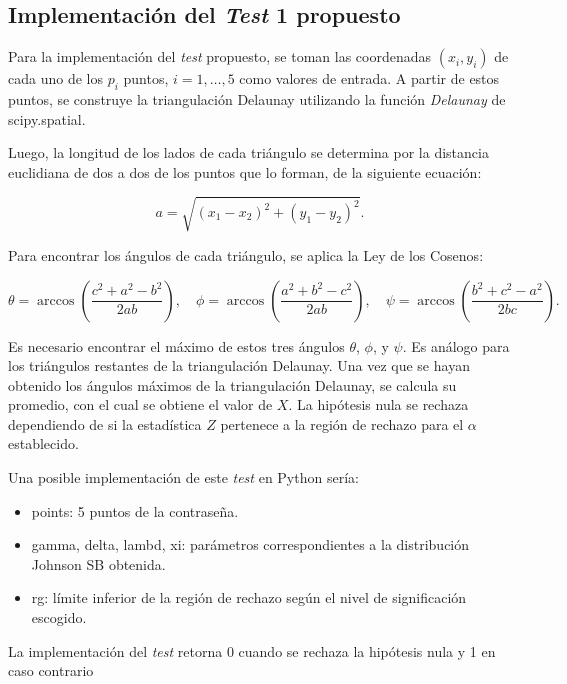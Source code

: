 \documentclass[12pt]{report}
\begin{document}
\subsection{Implementación del \textit{Test} 1 propuesto}
\label{sec:1.3}

Para la implementación del \textit{test} propuesto, se toman las coordenadas \((x_i, y_i)\) de cada uno de los \(p_i\) puntos, \(i = 1, \ldots, 5\) como valores de entrada. A partir de estos puntos, se construye la triangulación Delaunay utilizando la función \textit{Delaunay} de scipy.spatial.

Luego, la longitud de los lados de cada triángulo se determina por la distancia euclidiana de dos a dos de los puntos que lo forman, de la siguiente ecuación:

\[
a = \sqrt{(x_{1} - x_{2})^2 + (y_{1} - y_{2})^2} .
\]

Para encontrar los ángulos de cada triángulo, se aplica la Ley de los Cosenos:

\[
\theta = \arccos\left(\frac{c^2 + a^2 - b^2}{2ab}\right), \quad \phi = \arccos\left(\frac{a^2 + b^2 - c^2}{2ab}\right), \quad \psi = \arccos\left(\frac{b^2 + c^2 - a^2}{2bc}\right).
\]

Es necesario encontrar el máximo de estos tres ángulos \(\theta\), \(\phi\), y \(\psi\). Es análogo para los triángulos restantes de la triangulación Delaunay. Una vez que se hayan obtenido los ángulos máximos de la triangulación Delaunay, se calcula su promedio, con el cual se obtiene el valor de  \(X\). La hipótesis nula se rechaza dependiendo de si la estadística \(Z\) pertenece a la región de rechazo para el \(\alpha\) establecido.

Una posible implementación de este \textit{test} en Python sería:
\begin{itemize}
	\item points: 5 puntos de la contraseña. 
	\item gamma, delta, lambd, xi: parámetros correspondientes a la distribución Johnson SB obtenida.
	\item rg: límite inferior de la región de rechazo según el nivel de significación escogido.
	
\end{itemize}
La implementación del \textit{test} retorna 0 cuando se rechaza la hipótesis nula y 1 en caso contrario
\end{document}
